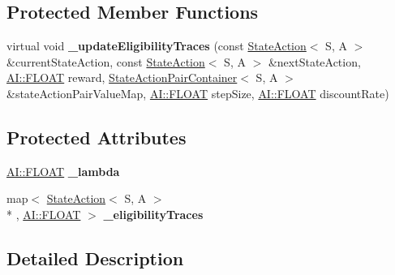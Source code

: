 \subsection*{Protected Member Functions}
\begin{DoxyCompactItemize}
\item 
\hypertarget{classAI_1_1Algorithm_1_1EligibilityTraces_a354115a368dc58abcdbc9285ec2537df}{virtual void {\bfseries \-\_\-update\-Eligibility\-Traces} (const \hyperlink{classAI_1_1StateAction}{State\-Action}$<$ S, A $>$ \&current\-State\-Action, const \hyperlink{classAI_1_1StateAction}{State\-Action}$<$ S, A $>$ \&next\-State\-Action, \hyperlink{namespaceAI_a41b74884a20833db653dded3918e05c3}{A\-I\-::\-F\-L\-O\-A\-T} reward, \hyperlink{classAI_1_1StateActionPairContainer}{State\-Action\-Pair\-Container}$<$ S, A $>$ \&state\-Action\-Pair\-Value\-Map, \hyperlink{namespaceAI_a41b74884a20833db653dded3918e05c3}{A\-I\-::\-F\-L\-O\-A\-T} step\-Size, \hyperlink{namespaceAI_a41b74884a20833db653dded3918e05c3}{A\-I\-::\-F\-L\-O\-A\-T} discount\-Rate)}\label{classAI_1_1Algorithm_1_1EligibilityTraces_a354115a368dc58abcdbc9285ec2537df}

\end{DoxyCompactItemize}
\subsection*{Protected Attributes}
\begin{DoxyCompactItemize}
\item 
\hypertarget{classAI_1_1Algorithm_1_1EligibilityTraces_a5c7e8c5c912cd0402cd4d60fb7c34da3}{\hyperlink{namespaceAI_a41b74884a20833db653dded3918e05c3}{A\-I\-::\-F\-L\-O\-A\-T} {\bfseries \-\_\-lambda}}\label{classAI_1_1Algorithm_1_1EligibilityTraces_a5c7e8c5c912cd0402cd4d60fb7c34da3}

\item 
\hypertarget{classAI_1_1Algorithm_1_1EligibilityTraces_aa4a94928533e63cb6b263f7abfde4e53}{map$<$ \hyperlink{classAI_1_1StateAction}{State\-Action}$<$ S, A $>$\\*
, \hyperlink{namespaceAI_a41b74884a20833db653dded3918e05c3}{A\-I\-::\-F\-L\-O\-A\-T} $>$ {\bfseries \-\_\-eligibility\-Traces}}\label{classAI_1_1Algorithm_1_1EligibilityTraces_aa4a94928533e63cb6b263f7abfde4e53}

\end{DoxyCompactItemize}


\subsection{Detailed Description}
